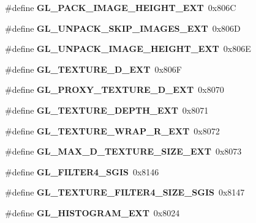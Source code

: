\begin{DoxyCompactItemize}
\item 
\#define {\bfseries G\+L\+\_\+\+P\+A\+C\+K\+\_\+\+I\+M\+A\+G\+E\+\_\+\+H\+E\+I\+G\+H\+T\+\_\+\+E\+X\+T}~0x806\+C\label{_s_d_l__opengl_8h_adea424b22939de3d329f48c9b0e54a20}

\item 
\#define {\bfseries G\+L\+\_\+\+U\+N\+P\+A\+C\+K\+\_\+\+S\+K\+I\+P\+\_\+\+I\+M\+A\+G\+E\+S\+\_\+\+E\+X\+T}~0x806\+D\label{_s_d_l__opengl_8h_a0a2136ef67ffb905ff1734fdfa8485bf}

\item 
\#define {\bfseries G\+L\+\_\+\+U\+N\+P\+A\+C\+K\+\_\+\+I\+M\+A\+G\+E\+\_\+\+H\+E\+I\+G\+H\+T\+\_\+\+E\+X\+T}~0x806\+E\label{_s_d_l__opengl_8h_a41f32cfcec66a0595e7020637e2bf379}

\item 
\#define {\bfseries G\+L\+\_\+\+T\+E\+X\+T\+U\+R\+E\+\_\+D\+\_\+\+E\+X\+T}~0x806\+F\label{_s_d_l__opengl_8h_a1b6d77d52099ad70dcf664c9c28019e4}

\item 
\#define {\bfseries G\+L\+\_\+\+P\+R\+O\+X\+Y\+\_\+\+T\+E\+X\+T\+U\+R\+E\+\_\+D\+\_\+\+E\+X\+T}~0x8070\label{_s_d_l__opengl_8h_a847d994af0d03bca0e188b96fcc3c4d6}

\item 
\#define {\bfseries G\+L\+\_\+\+T\+E\+X\+T\+U\+R\+E\+\_\+\+D\+E\+P\+T\+H\+\_\+\+E\+X\+T}~0x8071\label{_s_d_l__opengl_8h_a83ab5a881500431d94cef3bb7dfc91a8}

\item 
\#define {\bfseries G\+L\+\_\+\+T\+E\+X\+T\+U\+R\+E\+\_\+\+W\+R\+A\+P\+\_\+\+R\+\_\+\+E\+X\+T}~0x8072\label{_s_d_l__opengl_8h_a2356893451a14a5ee1f3c32d121b2d4b}

\item 
\#define {\bfseries G\+L\+\_\+\+M\+A\+X\+\_\+D\+\_\+\+T\+E\+X\+T\+U\+R\+E\+\_\+\+S\+I\+Z\+E\+\_\+\+E\+X\+T}~0x8073\label{_s_d_l__opengl_8h_a006a505ad519db19385366c3fbb12ca5}

\item 
\#define {\bfseries G\+L\+\_\+\+F\+I\+L\+T\+E\+R4\+\_\+\+S\+G\+I\+S}~0x8146\label{_s_d_l__opengl_8h_a0a973d46343de1cc76263e2f0042036d}

\item 
\#define {\bfseries G\+L\+\_\+\+T\+E\+X\+T\+U\+R\+E\+\_\+\+F\+I\+L\+T\+E\+R4\+\_\+\+S\+I\+Z\+E\+\_\+\+S\+G\+I\+S}~0x8147\label{_s_d_l__opengl_8h_a80dc2866f7b626a60f17ade9f4f2e44a}

\item 
\#define {\bfseries G\+L\+\_\+\+H\+I\+S\+T\+O\+G\+R\+A\+M\+\_\+\+E\+X\+T}~0x8024\label{_s_d_l__opengl_8h_a1d7f8b82ac499635ec6b9144790c15bf}


\end{DoxyCompactItemize}
